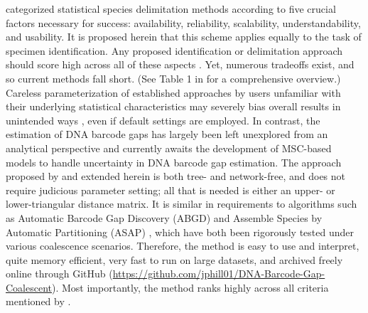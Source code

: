 \documentclass[12pt]{article}
\begin{document}
\citet{hubert2024delimiting} categorized statistical species delimitation methods according to five crucial factors necessary for success: availability, reliability, scalability, understandability, and usability. It is proposed herein that this scheme applies equally to the task of specimen identification.  Any proposed identification or delimitation approach should score high across all of these aspects \citep{hubert2024delimiting}. Yet, numerous tradeoffs exist, and so current methods fall short. (See Table 1 in \citet{hubert2024delimiting} for a comprehensive overview.) Careless parameterization of established approaches by users unfamiliar with their underlying statistical characteristics may severely bias overall results in unintended ways \citep{hart2007things}, even if default settings are employed. In contrast, the estimation of DNA barcode gaps has largely been left unexplored from an analytical perspective and currently awaits the development of MSC-based models to handle uncertainty in DNA barcode gap estimation. The approach proposed by \citet{phillips2024measure} and extended herein is both tree- and network-free, and does not require judicious parameter setting; all that is needed is either an upper- or lower-triangular distance matrix. It is similar in requirements to algorithms such as Automatic Barcode Gap Discovery (ABGD) \citep{puillandre2011abgd} and Assemble Species by Automatic Partitioning  (ASAP) \citep{puillandre2021asap}, which have both been rigorously tested under various coalescence scenarios. Therefore, the method is easy to use and interpret, quite memory efficient, very fast to run on large datasets, and archived freely online through GitHub (\href{https://github.com/jphill01/DNA-Barcode-Gap-Coalescent}{https://github.com/jphill01/DNA-Barcode-Gap-Coalescent}). Most importantly, the method ranks highly across all criteria mentioned by \citet{hubert2024delimiting}. 
\end{document}

